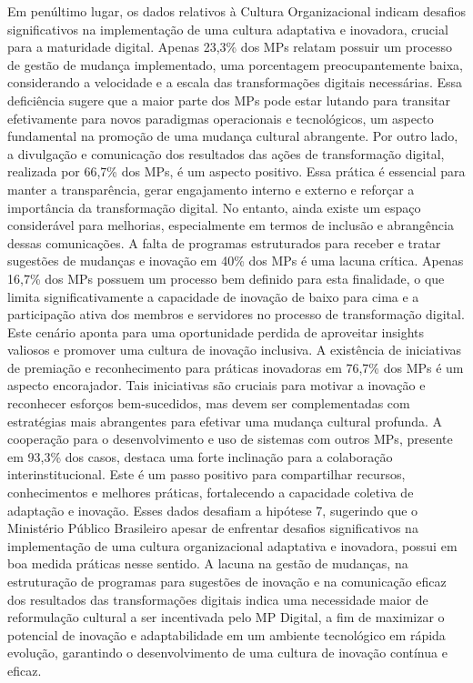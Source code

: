 Em penúltimo lugar, os dados relativos à Cultura Organizacional indicam desafios significativos na implementação de uma cultura adaptativa e inovadora, crucial para a maturidade digital. Apenas 23,3\% dos MPs relatam possuir um processo de gestão de mudança implementado, uma porcentagem preocupantemente baixa, considerando a velocidade e a escala das transformações digitais necessárias. Essa deficiência sugere que a maior parte dos MPs pode estar lutando para transitar efetivamente para novos paradigmas operacionais e tecnológicos, um aspecto fundamental na promoção de uma mudança cultural abrangente. Por outro lado, a divulgação e comunicação dos resultados das ações de transformação digital, realizada por 66,7\% dos MPs, é um aspecto positivo. Essa prática é essencial para manter a transparência, gerar engajamento interno e externo e reforçar a importância da transformação digital. No entanto, ainda existe um espaço considerável para melhorias, especialmente em termos de inclusão e abrangência dessas comunicações. A falta de programas estruturados para receber e tratar sugestões de mudanças e inovação em 40\% dos MPs é uma lacuna crítica. Apenas 16,7\% dos MPs possuem um processo bem definido para esta finalidade, o que limita significativamente a capacidade de inovação de baixo para cima e a participação ativa dos membros e servidores no processo de transformação digital. Este cenário aponta para uma oportunidade perdida de aproveitar insights valiosos e promover uma cultura de inovação inclusiva. A existência de iniciativas de premiação e reconhecimento para práticas inovadoras em 76,7\% dos MPs é um aspecto encorajador. Tais iniciativas são cruciais para motivar a inovação e reconhecer esforços bem-sucedidos, mas devem ser complementadas com estratégias mais abrangentes para efetivar uma mudança cultural profunda. A cooperação para o desenvolvimento e uso de sistemas com outros MPs, presente em 93,3\% dos casos, destaca uma forte inclinação para a colaboração interinstitucional. Este é um passo positivo para compartilhar recursos, conhecimentos e melhores práticas, fortalecendo a capacidade coletiva de adaptação e inovação. Esses dados desafiam a hipótese 7, sugerindo que o Ministério Público Brasileiro apesar de enfrentar desafios significativos na implementação de uma cultura organizacional adaptativa e inovadora, possui em boa medida práticas nesse sentido. A lacuna na gestão de mudanças, na estruturação de programas para sugestões de inovação e na comunicação eficaz dos resultados das transformações digitais indica uma necessidade maior de reformulação cultural a ser incentivada pelo MP Digital, a fim de maximizar o potencial de inovação e adaptabilidade em um ambiente tecnológico em rápida evolução, garantindo o desenvolvimento de uma cultura de inovação contínua e eficaz.

